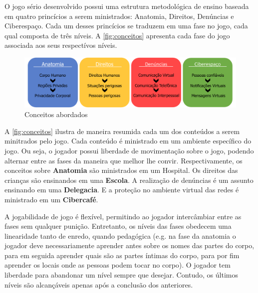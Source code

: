 
O jogo sério desenvolvido possui uma estrutura metodológica de ensino baseada em quatro princícios a serem ministrados: Anatomia, Direitos, Denúncias e Ciberespaço. Cada um desses princícios se traduzem em uma fase no jogo, cada qual composta de três níveis. A \autoref{fig:conceitos} apresenta cada fase do jogo associada aos seus respectívos níveis.


\begin{figure}[hbt!]
  \caption{\label{fig:conceitos}Conceitos abordados}
  \begin{center}
    \includegraphics[width=\linewidth]{./Figuras/EsquemaFases.pdf}
    \end{center}
  
\end{figure}

A \autoref{fig:conceitos} ilustra de maneira resumida cada um dos conteúdos a serem minitrados pelo jogo. Cada conteúdo é ministrado em um ambiente específico do jogo. Ou seja, o jogador possui liberdade de movimentação sobre o jogo, podendo alternar entre as fases da maneira que melhor lhe convir. Respectivamente, os conceitos sobre \textbf{Anatomia} são ministrados em um Hospital. Os direitos das crianças são ensinandos em uma \textbf{Escola}. A realização de denúncias é um assunto ensinando em uma \textbf{Delegacia}. E a proteção no ambiente virtual das redes é ministrado em um \textbf{Cibercafé}.

A jogabilidade de jogo é flexível, permitindo ao jogador intercâmbiar entre as fases sem qualquer punição. Entretanto, os níveis das fases obedecem uma linearidade tanto de enredo, quando pedagógica (e.g. na fase da anatomia o jogador deve necessariamente aprender antes sobre os nomes das partes do corpo, para em seguida aprender quais são as partes íntimas do corpo, para por fim aprender os locais onde as pessoas podem tocar no corpo). O jogador tem liberdade para abandonar um nível sempre que desejar. Contudo, os últimos níveis são alcançáveis apenas após a conclusão dos anteriores. 

